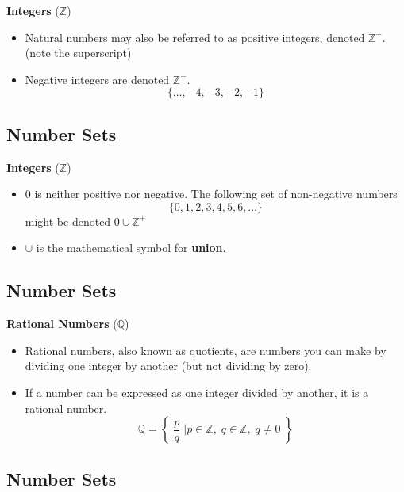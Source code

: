 \documentclass[]{report}
\begin{document}
\textbf{Integers} ($\mathbb{Z}$)
\begin{itemize}
\item Natural numbers may also be referred to as positive integers, denoted $\mathbb{Z}^{+}$. \\(note the superscript)
\item Negative integers are denoted $\mathbb{Z}^{-}$.
\[\{\ldots,-4,-3,-2,-1\}\]
\end{itemize}



\subsection{Number Sets}

\textbf{Integers} ($\mathbb{Z}$)
\begin{itemize}
\item 0 is neither positive nor negative. The following set of non-negative numbers \[\{0,1,2,3,4,5,6,\ldots\} \] might be denoted $0 \cup \mathbb{Z}^{+}$
\item $\cup$ is the mathematical symbol for \textbf{union}.
\end{itemize}



\subsection{Number Sets}

\textbf{Rational Numbers} ($\mathbb{Q}$)
\begin{itemize}
\item Rational numbers, also known as quotients, are numbers you can make by dividing one integer by another (but not dividing by zero). 
\item If a number can be expressed as one integer divided by another, it is a rational number.
\[ \mathbb{Q} = \left\{\; \frac{p}{q} \;\bigg| p \in \mathbb{Z},\; q \in \mathbb{Z},\; q \neq 0  \;   \right\}   \]
\end{itemize}


\subsection{Number Sets}
\end{document}
